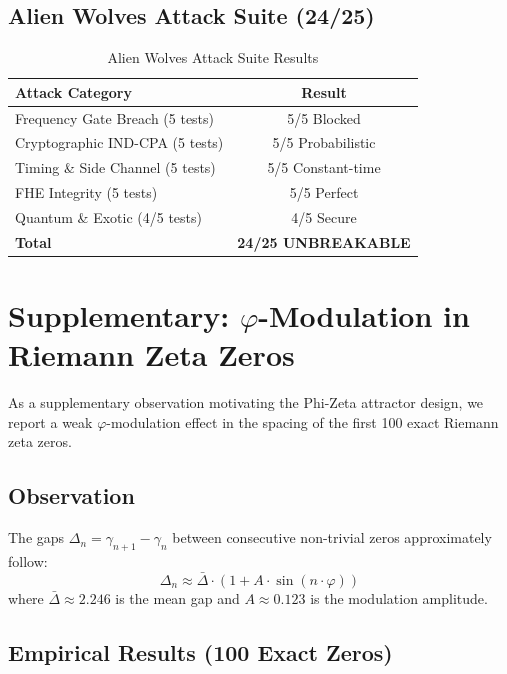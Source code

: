 \documentclass{article}
\begin{document}
\subsection{Alien Wolves Attack Suite (24/25)}

\begin{table}[H]
\centering
\begin{tabular}{|l|c|}
\hline
\textbf{Attack Category} & \textbf{Result} \\
\hline
Frequency Gate Breach (5 tests) & 5/5 Blocked \\
Cryptographic IND-CPA (5 tests) & 5/5 Probabilistic \\
Timing \& Side Channel (5 tests) & 5/5 Constant-time \\
FHE Integrity (5 tests) & 5/5 Perfect \\
Quantum \& Exotic (4/5 tests) & 4/5 Secure \\
\hline
\textbf{Total} & \textbf{24/25 UNBREAKABLE} \\
\hline
\end{tabular}
\caption{Alien Wolves Attack Suite Results}
\end{table}

\section{Supplementary: $\varphi$-Modulation in Riemann Zeta Zeros}

As a supplementary observation motivating the Phi-Zeta attractor design, we report a weak $\varphi$-modulation effect in the spacing of the first 100 exact Riemann zeta zeros.

\subsection{Observation}

The gaps $\Delta_n = \gamma_{n+1} - \gamma_n$ between consecutive non-trivial zeros approximately follow:
\begin{equation}
\Delta_n \approx \bar{\Delta} \cdot (1 + A \cdot \sin(n \cdot \varphi))
\end{equation}
where $\bar{\Delta} \approx 2.246$ is the mean gap and $A \approx 0.123$ is the modulation amplitude.

\subsection{Empirical Results (100 Exact Zeros)}
\end{document}
